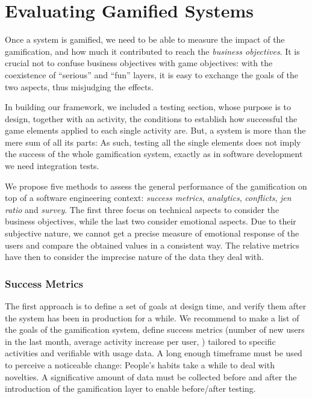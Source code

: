 \section{Evaluating Gamified Systems}\label{sec:gamification-evaluation}

Once a system is gamified, we need to be able to measure the impact of the gamification, and how much it contributed to reach the \emph{business objectives}.
It is crucial not to confuse business objectives with game objectives: with the coexistence of ``serious'' and ``fun'' layers, it is easy to exchange the goals of the two aspects, thus misjudging the effects.

In building our framework, we included a testing section, whose purpose is to design, together with an activity, the conditions to establish how successful the game elements applied to each single activity are.
But, a system is more than the mere sum of all its parts: As such, testing all the single elements does not imply the success of the whole gamification system, exactly as in software development we need integration tests.

We propose five methods to assess the general performance of the gamification on top of a software engineering context: \emph{success metrics}, \emph{analytics}, \emph{conflicts}, \emph{jen ratio} and \emph{survey}.
The first three focus on technical aspects to consider the business objectives, while the last two consider emotional aspects.
Due to their subjective nature, we cannot get a precise measure of emotional response of the users and compare the obtained values in a consistent way.
The relative metrics have then to consider the imprecise nature of the data they deal with.


\subsubsection{Success Metrics}

The first approach is to define a set of goals at design time, and verify them after the system has been in production for a while.
We recommend to make a list of the goals of the gamification system, define success metrics (number of new users in the last month, average activity increase per user, \etc) tailored to specific activities and verifiable with usage data.
A long enough timeframe must be used to perceive a noticeable change: People's habits take a while to deal with novelties.
A significative amount of data must be collected before and after the introduction of the gamification layer to enable before/after testing.


